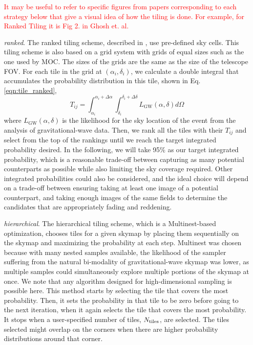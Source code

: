 \documentclass[twocolumn]{aastex62}
\begin{document}
\textcolor{red}{It may be useful to refer to specific figures from papers corresponding to each strategy below
that give a visual idea of how the tiling is done. For example, for Ranked Tiling it is Fig 2. in Ghosh et. al.}

\emph{ranked}. The ranked tiling scheme, described in \cite{GhBl2016}, use pre-defined sky cells. This tiling scheme is also based on a grid system with grids of equal sizes such as the one used by MOC. The sizes of the grids are the same as the size of the telescope FOV. For each tile in the grid at $(\alpha_i, \delta_i)$, we calculate a double integral that accumulates the probability distribution in this tile, shown in Eq.\ref{eqn:tile_ranked},
\begin{equation}\label{eqn:tile_ranked}
T_{ij} = \int_{\alpha_i}^{\alpha_i+\Delta \alpha}\int_{\delta_i}^{\delta_i+\Delta \delta}L_\textrm{GW}(\alpha,\delta)d\Omega
\end{equation}
where $L_\textrm{GW}(\alpha,\delta)$ is the likelihood for the sky location of the event from the analysis of gravitational-wave data.
Then, we rank all the tiles with their $T_{ij}$ and select from the top of the rankings until we reach the target integrated probability desired.
In the following, we will take 95\% as our target integrated probability, which is a reasonable trade-off between capturing as many potential counterparts as possible while also limiting the sky coverage required. Other integrated probabilities could also be considered, and the ideal choice will depend on a trade-off between ensuring taking at least one image of a potential counterpart, and taking enough images of the same fields to determine the candidates that are appropriately fading and reddening.

\emph{hierarchical}. The hierarchical tiling scheme, which is a Multinest-based \citep{FeHo2009,FeGa2009,BuGe2014} optimization, chooses tiles for a given skymap by placing them sequentially on the skymap and maximizing the probability at each step. Multinest was chosen because with many nested samples available, the likelihood of the sampler suffering from the natural bi-modality of gravitational-wave skymap was lower, as multiple samples could simultaneously explore multiple portions of the skymap at once. We note that any algorithm designed for high-dimensional sampling is possible here. This method starts by selecting the tile that covers the most probability. Then, it sets the probability in that tile to be zero before going to the next iteration, when it again selects the tile that covers the most probability. It stops when a user-specified number of tiles, $N_{\rm tiles}$, are selected. The tiles selected might overlap on the corners when there are higher probability distributions around that corner. 
 
\end{document}
